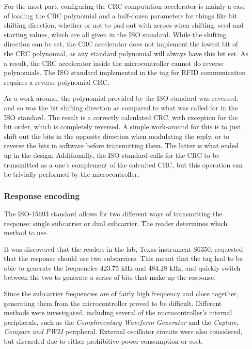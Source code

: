 For the most part, configuring the CRC computation accelerator is mainly a case of loading the
CRC polynomial and a half-dozen parameters for things like bit shifting direction, whether or not to pad
out with zeroes when shifting, seed and starting values, which are all given in the ISO standard.
While the shifting direction can be set, the CRC
accelerator does not implement the lowest bit of the CRC polynomial, as any standard polynomial will always have
this bit set. As a result, the CRC accelerator inside the microcontroller cannot do reverse polynomials.
The ISO standard implemented in the tag for RFID communication requires a reverse polynomial CRC.

As a work-around, the polynomial provided by the ISO standard was reversed, and so was the bit shifting
direction as compared to what was called for in the ISO standard. The result is a correctly calculated
CRC, with exception for the bit order, which is completely reversed. A simple work-around for this is to
just shift out the bits in the opposite direction when modulating the reply, or to reverse the bits
in software before transmitting them. The latter is what ended up in the design. Additionally, the ISO standard
calls for the CRC to be transmitted as a one's complement of the calculted CRC, but this operation
can be trivially performed by the microcontroller.


\subsubsection{Response encoding}
The ISO-15693 standard allows for two different ways of transmitting the response: single subcarrier or dual subcarrier.\cite{rfid-iso}
The reader determines which method to use.

It was discovered that the readers in the lab, Texas instrument S6350, requested that the response should use two subcarriers.
This meant that the tag had to be able to generate the frequencies 423.75 kHz and 484.28 kHz, and quickly switch between the two to generate a series of bits that make up the response.

Since the subcarrier frequencies are of fairly high frequency and close together, generating them from the microcontroller proved to be difficult.
Different methods were investigated, including several of the microcontroller's internal peripherals, such as the \emph{Complimentary Waveform Generator} and the \emph{Capture, Compare and PWM} peripheral. External oscillator circuits were also considered, but discarded due to either prohibitive power consumption or cost.

